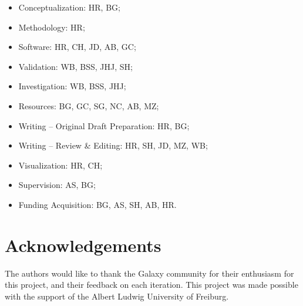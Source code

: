 \documentclass[a4paper,num-refs]{oup-contemporary}
\begin{document}
\begin{itemize}
    \item Conceptualization: HR, BG; %
    \item Methodology: HR;
    \item Software: HR, CH, JD, AB, GC; %
    \item Validation: WB, BSS, JHJ, SH; %
    \item Investigation: WB, BSS, JHJ; %
    \item Resources: BG, GC, SG, NC, AB, MZ; %
    \item Writing – Original Draft Preparation: HR, BG; %
    \item Writing – Review \& Editing: HR, SH, JD, MZ, WB; %
    \item Visualization: HR, CH; %
    \item Supervision: AS, BG; %
    \item Funding Acquisition: BG, AS, SH, AB, HR. %
\end{itemize}

\section{Acknowledgements}
The authors would like to thank the Galaxy community for their enthusiasm for this project, and their feedback on each iteration.
This project was made possible with the support of the Albert Ludwig University of Freiburg.


\end{document}

